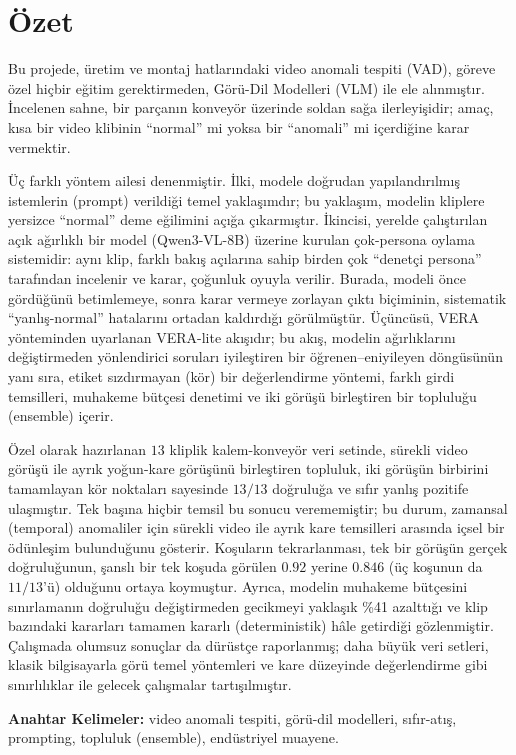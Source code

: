 \chapter*{Özet}

Bu projede, üretim ve montaj hatlarındaki video anomali tespiti (VAD), göreve özel hiçbir
eğitim gerektirmeden, Görü-Dil Modelleri (VLM) ile ele alınmıştır. İncelenen sahne, bir
parçanın konveyör üzerinde soldan sağa ilerleyişidir; amaç, kısa bir video klibinin
``normal'' mi yoksa bir ``anomali'' mi içerdiğine karar vermektir.

Üç farklı yöntem ailesi denenmiştir. İlki, modele doğrudan yapılandırılmış istemlerin
(prompt) verildiği temel yaklaşımdır; bu yaklaşım, modelin kliplere yersizce ``normal''
deme eğilimini açığa çıkarmıştır. İkincisi, yerelde çalıştırılan açık ağırlıklı bir model
(Qwen3-VL-8B) üzerine kurulan çok-persona oylama sistemidir: aynı klip, farklı bakış
açılarına sahip birden çok ``denetçi persona'' tarafından incelenir ve karar, çoğunluk
oyuyla verilir. Burada, modeli önce gördüğünü betimlemeye, sonra karar vermeye zorlayan
çıktı biçiminin, sistematik ``yanlış-normal'' hatalarını ortadan kaldırdığı görülmüştür.
Üçüncüsü, VERA yönteminden uyarlanan VERA-lite akışıdır; bu akış, modelin ağırlıklarını
değiştirmeden yönlendirici soruları iyileştiren bir öğrenen--eniyileyen döngüsünün yanı
sıra, etiket sızdırmayan (kör) bir değerlendirme yöntemi, farklı girdi temsilleri,
muhakeme bütçesi denetimi ve iki görüşü birleştiren bir topluluğu (ensemble) içerir.

Özel olarak hazırlanan $13$ kliplik kalem-konveyör veri setinde, sürekli video görüşü ile
ayrık yoğun-kare görüşünü birleştiren topluluk, iki görüşün birbirini tamamlayan kör
noktaları sayesinde $13/13$ doğruluğa ve sıfır yanlış pozitife ulaşmıştır. Tek başına
hiçbir temsil bu sonucu verememiştir; bu durum, zamansal (temporal) anomaliler için
sürekli video ile ayrık kare temsilleri arasında içsel bir ödünleşim bulunduğunu gösterir.
Koşuların tekrarlanması, tek bir görüşün gerçek doğruluğunun, şanslı bir tek koşuda
görülen $0.92$ yerine $0.846$ (üç koşunun da $11/13$'ü) olduğunu ortaya koymuştur. Ayrıca,
modelin muhakeme bütçesini sınırlamanın doğruluğu değiştirmeden gecikmeyi yaklaşık \%41
azalttığı ve klip bazındaki kararları tamamen kararlı (deterministik) hâle getirdiği
gözlenmiştir. Çalışmada olumsuz sonuçlar da dürüstçe raporlanmış; daha büyük veri setleri,
klasik bilgisayarla görü temel yöntemleri ve kare düzeyinde değerlendirme gibi
sınırlılıklar ile gelecek çalışmalar tartışılmıştır.

\vfill
\textbf{Anahtar Kelimeler:} video anomali tespiti, görü-dil modelleri, sıfır-atış,
prompting, topluluk (ensemble), endüstriyel muayene.
\clearpage
